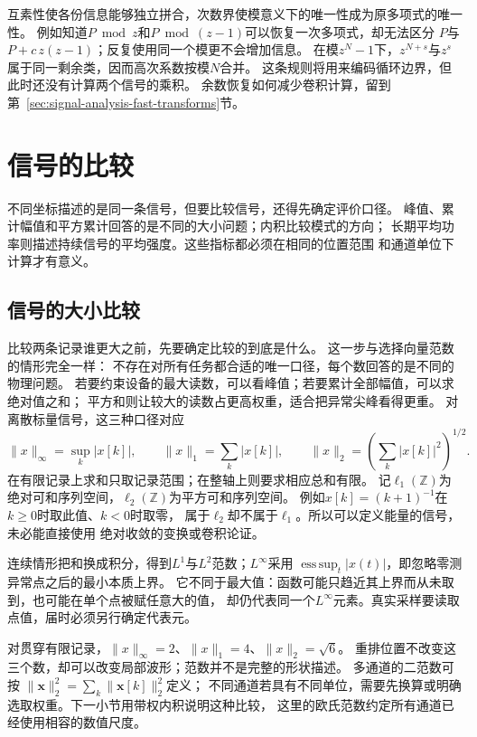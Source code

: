 互素性使各份信息能够独立拼合，次数界使模意义下的唯一性成为原多项式的唯一性。
例如知道$P\bmod z$和$P\bmod(z-1)$可以恢复一次多项式，却无法区分
$P$与$P+c\,z(z-1)$；反复使用同一个模更不会增加信息。
在模$z^N-1$下，$z^{N+s}$与$z^s$属于同一剩余类，因而高次系数按模$N$合并。
这条规则将用来编码循环边界，但此时还没有计算两个信号的乘积。
余数恢复如何减少卷积计算，留到第~\ref{sec:signal-analysis-fast-transforms}节。

\section{信号的比较}
\label{sec:signal-comparison}

不同坐标描述的是同一条信号，但要比较信号，还得先确定评价口径。
峰值、累计幅值和平方累计回答的是不同的大小问题；内积比较模式的方向；
长期平均功率则描述持续信号的平均强度。这些指标都必须在相同的位置范围
和通道单位下计算才有意义。

\subsection{信号的大小比较}

比较两条记录谁更大之前，先要确定比较的到底是什么。
这一步与选择向量范数的情形完全一样：
不存在对所有任务都合适的唯一口径，每个数回答的是不同的物理问题。
若要约束设备的最大读数，可以看峰值；若要累计全部幅值，可以求绝对值之和；
平方和则让较大的读数占更高权重，适合把异常尖峰看得更重。
对离散标量信号，这三种口径对应
\[
  \|x\|_\infty=\sup_k|x[k]|,\qquad
  \|x\|_1=\sum_k|x[k]|,\qquad
  \|x\|_2=\left(\sum_k|x[k]|^2\right)^{1/2}.
\]
在有限记录上求和只取记录范围；在整轴上则要求相应总和有限。
记$\ell_1(\mathbb Z)$为绝对可和序列空间，$\ell_2(\mathbb Z)$为平方可和序列空间。
例如$x[k]=(k+1)^{-1}$在$k\geq0$时取此值、$k<0$时取零，
属于$\ell_2$却不属于$\ell_1$。所以可以定义能量的信号，未必能直接使用
绝对收敛的变换或卷积论证。

连续情形把和换成积分，得到$L^1$与$L^2$范数；$L^\infty$采用
$\operatorname*{ess\,sup}_t|x(t)|$，即忽略零测异常点之后的最小本质上界。
它不同于最大值：函数可能只趋近其上界而从未取到，也可能在单个点被赋任意大的值，
却仍代表同一个$L^\infty$元素。真实采样要读取点值，届时必须另行确定代表元。

对贯穿有限记录，$\|x\|_\infty=2$、$\|x\|_1=4$、$\|x\|_2=\sqrt6$。
重排位置不改变这三个数，却可以改变局部波形；范数并不是完整的形状描述。
多通道的二范数可按
$\|\bm x\|_2^2=\sum_k\|\bm x[k]\|_2^2$定义；
不同通道若具有不同单位，需要先换算或明确选取权重。下一小节用带权内积说明这种比较，
这里的欧氏范数约定所有通道已经使用相容的数值尺度。

